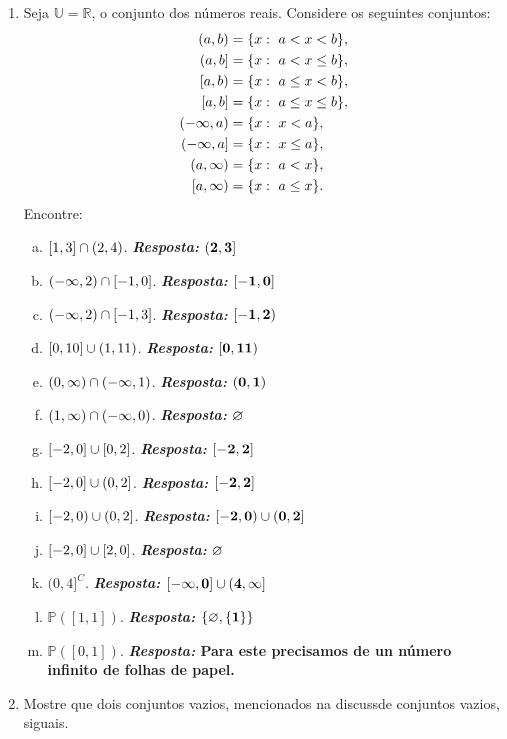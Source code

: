 \begin{enumerate}[{\bf 1.}]
\item Seja $\mathbb{U}=\mathbb{R}$, o conjunto dos n\'umeros reais. Considere os seguintes conjuntos:
\begin{equation*}
 \begin{aligned}
(a,b)&=\{x:\espaco a<x<b\},\\
(a,b]&=\{x:\espaco a<x\leq b\},\\
[a,b)&=\{x:\espaco a\leq x< b\},\\
[a,b]&=\{x:\espaco a\leq x\leq b\},\\
(-\infty,a)&=\{x:\espaco x<a\},\\
(-\infty,a]&=\{x:\espaco x\leq a\},\\
(a,\infty)&=\{x:\espaco a<x\},\\
[a,\infty)&=\{x:\espaco a\leq x\}.
 \end{aligned}
\end{equation*}
Encontre:
\begin{enumerate}[a)]
\item $[1,3]\cap(2,4)$. {\bf{\it Resposta:} ${\bf (2,3]}$}
\item $(-\infty,2)\cap[-1,0]$. {\bf{\it Resposta:} ${\bf [-1,0]}$}
\item $(-\infty,2)\cap[-1,3]$. {\bf{\it Resposta:} ${\bf [-1,2)}$}
\item $[0,10]\cup(1,11)$. {\bf{\it Resposta:} ${\bf [0,11)}$}
\item $(0,\infty)\cap(-\infty,1)$. {\bf{\it Resposta:} ${\bf (0,1)}$}
\item $(1,\infty)\cap(-\infty,0)$. {\bf{\it Resposta:} ${\bf \varnothing}$}
\item $[-2,0]\cup[0,2]$. {\bf{\it Resposta:} ${\bf [-2,2]}$}
\item $[-2,0]\cup(0,2]$. {\bf{\it Resposta:} ${\bf [-2,2]}$}
\item $[-2,0)\cup(0,2]$. {\bf{\it Resposta:} ${\bf [-2,0)\cup(0,2]}$}
\item $[-2,0]\cup[2,0]$. {\bf{\it Resposta:} ${\bf \varnothing}$}
\item $(0,4]^C$. {\bf{\it Resposta:} ${\bf [-\infty,0]\cup(4,\infty]}$}
\item $\mathbb{P}([1,1])$. {\bf{\it Resposta:} ${\bf \{\varnothing,\{1\}\}}$}
\item $\mathbb{P}([0,1])$. {\bf{\it Resposta:} Para este precisamos de un n\'umero infinito de folhas de papel.}
\end{enumerate}

\item Mostre que dois conjuntos vazios, mencionados na discuss\ao de conjuntos vazios, s\ao iguais.


\end{enumerate}
